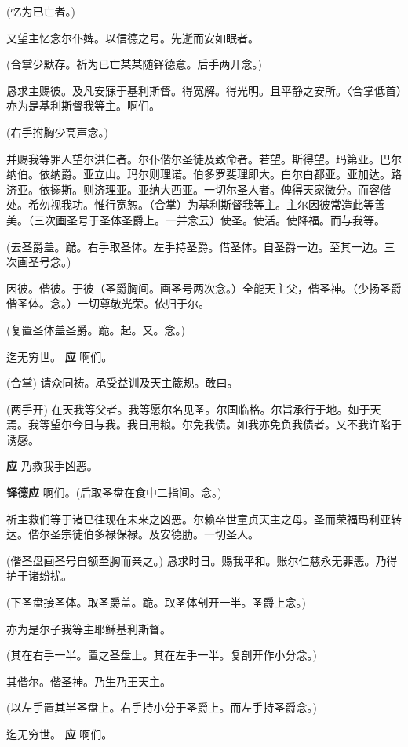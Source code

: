\documentclass[UTF8,17pt]{ctexart}
\newcommand{\blood}[1]{\textcolor{Mahogany}{#1}}
\begin{document}
(忆为已亡者。)

又望主忆念尔仆婢。以信德之号。先逝⽽安如眠者。

(合掌少默存。祈为已亡某某随铎德意。后⼿两开念。)

恳求主赐彼。及凡安寐于基利斯督。得宽解。得光明。且平静之安所。〈合掌低⾸）亦为是基利斯督我等主。啊们。

(右⼿拊胸少⾼声念。)

并赐我等罪⼈望尔洪仁者。尔仆偕尔圣徒及致命者。若望。斯得望。玛第亚。巴尔纳伯。依纳爵。亚⽴⼭。玛尔则理诺。伯多罗斐理即⼤。⽩尔⽩都亚。亚加达。路济亚。依搦斯。则济理亚。亚纳⼤西亚。⼀切尔圣⼈者。俾得天家微分。⽽容偕处。希勿视我功。惟⾏宽恕。（合掌）为基利斯督我等主。主尔因彼常造此等善美。（三次画圣号于圣体圣爵上。⼀并念云）使\blood{\maltese}圣。使\blood{\maltese}活。使降\blood{\maltese}福。⽽与我等。

(去圣爵盖。跪。右⼿取圣体。左⼿持圣爵。借圣体。⾃圣爵⼀边。⾄其⼀边。三次画圣号念。)

因\blood{\maltese}彼。偕\blood{\maltese}彼。于\blood{\maltese}彼（圣爵胸间。画圣号两次念。）全能\blood{\maltese}天主⽗，偕圣\blood{\maltese}神。（少扬圣爵偕圣体。念。）⼀切尊敬光荣。依归于尔。

(复置圣体盖圣爵。跪。起。又。念。)

迄⽆穷世。 \hfill \textbf{应} \quad 啊们。

(合掌) \quad 请众同祷。承受益训及天主箴规。敢⽈。

(两⼿开) \quad 在天我等⽗者。我等愿尔名见圣。尔国临格。尔旨承⾏于地。如于天焉。我等望尔今⽇与我。我⽇⽤粮。尔免我债。如我亦免负我债者。又不我许陷于诱感。

\textbf{应} \quad 乃救我⼿凶恶。

\textbf{铎德应} \quad 啊们。(后取圣盘在⾷中⼆指间。念。)

祈主救们等于诸已往现在未来之凶恶。尔赖卒世童贞天主之母。圣⽽荣福玛利亚转达。偕尔圣宗徒伯多禄保禄。及安德肋。⼀切圣⼈。

(偕圣盘画圣号⾃额⾄胸⽽亲之。) 恳求时⽇。赐我平和。账尔仁慈永⽆罪恶。乃得护于诸纷扰。

(下圣盘接圣体。取圣爵盖。跪。取圣体剖开⼀半。圣爵上念。)

亦为是尔⼦我等主耶稣基利斯督。

(其在右⼿⼀半。置之圣盘上。其在左⼿⼀半。复剖开作⼩分念。)

其偕尔。偕圣神。乃⽣乃王天主。

(以左⼿置其半圣盘上。右⼿持⼩分于圣爵上。⽽左⼿持圣爵念。)

迄⽆穷世。 \hfill \textbf{应} \quad 啊们。
\end{document}
